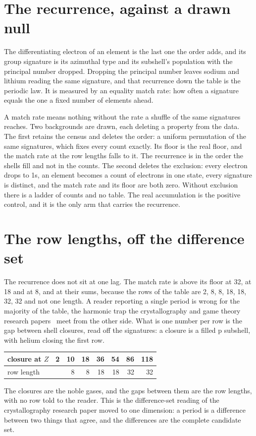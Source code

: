 \section{The recurrence, against a drawn null}

The differentiating electron of an element is the last one the order adds, and its group signature is
its azimuthal type and its subshell's population with the principal number dropped. Dropping the
principal number leaves sodium and lithium reading the same signature, and that recurrence down the
table is the periodic law. It is measured by an equality match rate: how often a signature equals the
one a fixed number of elements ahead.

A match rate means nothing without the rate a shuffle of the same signatures reaches. Two
backgrounds are drawn, each deleting a property from the data. The first retains the census and deletes
the order: a uniform permutation of the same signatures, which fixes every count exactly. Its floor
is the real floor, and the match rate at the row lengths falls to it. The recurrence is in the order
the shells fill and not in the counts. The second deletes the exclusion: every electron drops to 1s,
an element becomes a count of electrons in one state, every signature is distinct, and the match rate
and its floor are both zero. Without exclusion there is a ladder of counts and no table. The real
accumulation is the positive control, and it is the only arm that carries the recurrence.

\section{The row lengths, off the difference set}

The recurrence does not sit at one lag. The match rate is above its floor at 32, at 18 and at 8,
and at their sums, because the rows of the table are 2, 8, 8, 18, 18, 32, 32 and not one length. A
reader reporting a single period is wrong for the majority of the table, the harmonic trap the crystallography
and game theory research papers~\cite{src:Quigg-crystallography,src:Quigg-game-theory} meet from the
other side. What is one number per row is the gap between shell closures, read off the signatures: a
closure is a filled p subshell, with helium closing the first row.

\begin{center}
\begin{tabular}{@{}lrrrrrrr@{}}
\toprule
closure at $Z$ & 2 & 10 & 18 & 36 & 54 & 86 & 118 \\
\midrule
row length     &   & 8  & 8  & 18 & 18 & 32 & 32 \\
\bottomrule
\end{tabular}
\end{center}

\noindent The closures are the noble gases, and the gaps between them are the row lengths, with no
row told to the reader. This is the difference-set reading of the crystallography research paper
moved to one dimension: a period is a difference between two things that agree, and the differences
are the complete candidate set.
